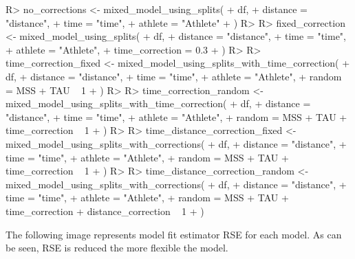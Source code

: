 \documentclass[
]{jss}
\begin{document}
\begin{CodeChunk}
\begin{CodeInput}
R> no_corrections <- mixed_model_using_splits(
+   df,
+   distance = "distance",
+   time = "time",
+   athlete = "Athlete"
+ )
R> 
R> fixed_correction <- mixed_model_using_splits(
+   df,
+   distance = "distance",
+   time = "time",
+   athlete = "Athlete",
+   time_correction = 0.3
+ )
R> 
R> time_correction_fixed <- mixed_model_using_splits_with_time_correction(
+   df,
+   distance = "distance",
+   time = "time",
+   athlete = "Athlete",
+   random = MSS + TAU ~ 1
+ )
R> 
R> time_correction_random <- mixed_model_using_splits_with_time_correction(
+   df,
+   distance = "distance",
+   time = "time",
+   athlete = "Athlete",
+   random = MSS + TAU + time_correction ~ 1
+ )
R> 
R> time_distance_correction_fixed <- mixed_model_using_splits_with_corrections(
+   df,
+   distance = "distance",
+   time = "time",
+   athlete = "Athlete",
+   random = MSS + TAU + time_correction ~ 1
+ )
R> 
R> time_distance_correction_random <- mixed_model_using_splits_with_corrections(
+   df,
+   distance = "distance",
+   time = "time",
+   athlete = "Athlete",
+   random = MSS + TAU + time_correction + distance_correction ~ 1
+ )
\end{CodeInput}
\end{CodeChunk}

The following image represents model fit estimator RSE for each model. As can be seen, RSE is reduced the more flexible the model.
\end{document}
